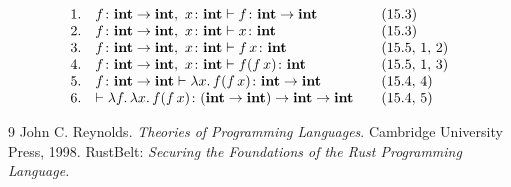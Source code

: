 \documentclass[runningheads]{llncs}
\newcommand{\Int}{\mathbf{int}}
\begin{document}
\[
\begin{array}{r l @{\qquad} l}
1. & f\colon\Int\to\Int,\ x\colon\Int \vdash f\colon\Int\to\Int & (15.3)\\
2. & f\colon\Int\to\Int,\ x\colon\Int \vdash x\colon\Int & (15.3)\\
3. & f\colon\Int\to\Int,\ x\colon\Int \vdash f\,x\colon\Int & (15.5,\,1,\,2)\\
4. & f\colon\Int\to\Int,\ x\colon\Int \vdash f(f\,x)\colon\Int & (15.5,\,1,\,3)\\
5. & f\colon\Int\to\Int \vdash \lambda x.\,f(f\,x)\colon\Int\to\Int & (15.4,\,4)\\
6. & \vdash \lambda f.\,\lambda x.\,f(f\,x)\colon(\Int\to\Int)\to\Int\to\Int & (15.4,\,5)
\end{array}
\]
\begin{thebibliography}{9}
 John C. Reynolds.
\textit{Theories of Programming Languages}.
Cambridge University Press, 1998.
 RustBelt:
\textit{Securing the Foundations of the Rust Programming Language.}
\end{thebibliography}
\end{document}
